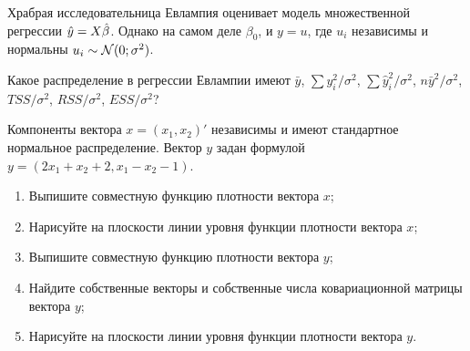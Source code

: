 \begin{problem}
Храбрая исследовательница Евлампия оценивает модель
множественной регрессии $\hat{y} = X\hat{\beta}$.
Однако на самом деле $\beta_0$, и $y=u$,
где $u_i$ независимы и нормальны $u_i \sim \mathcal{N}(0;\sigma^2)$.

Какое распределение в регрессии Евлампии имеют $\bar y$, $\sum y_i^2/\sigma^2$,
$\sum \hat y_i^2/\sigma^2$,
$n\bar y^2/\sigma^2$, $TSS/\sigma^2$, $RSS/\sigma^2$, $ESS/\sigma^2$?
\begin{sol}

\end{sol}
\end{problem}



\begin{problem}
Компоненты вектора $x=(x_1, x_2)'$ независимы и имеют стандартное нормальное распределение. Вектор $y$ задан формулой $y = (2x_1 + x_2 + 2, x_1 - x_2 - 1)$.
\begin{enumerate}
  \item Выпишите совместную функцию плотности вектора $x$;
  \item Нарисуйте на плоскости линии уровня функции плотности вектора $x$;
  \item Выпишите совместную функцию плотности вектора $y$;
  \item Найдите собственные векторы и собственные числа ковариационной матрицы вектора $y$;
  \item Нарисуйте на плоскости линии уровня функции плотности вектора $y$.
\end{enumerate}
\begin{sol}
\end{sol}
\end{problem}


